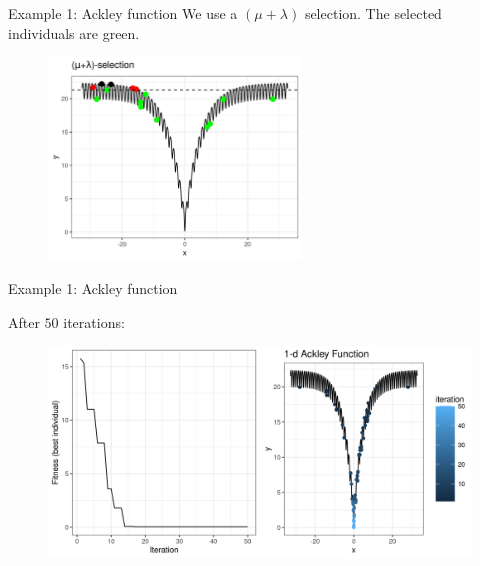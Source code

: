\documentclass[11pt,compress,t,notes=noshow, xcolor=table]{beamer}
\begin{document}
\begin{vbframe}{Example 1: Ackley function}
We use a $(\mu + \lambda)$ selection. The selected individuals are green.

\vspace{0.5cm}

\begin{center}
\begin{figure}
  \includegraphics[width=0.6\textwidth]{figure_man/1dim-ackley-func-selection.png}
\end{figure}
\end{center}


\end{vbframe}

\begin{vbframe}{Example 1: Ackley function}

After $50$ iterations: 

\vspace{0.5cm}

\begin{center}
\begin{figure}
  \includegraphics[width=1\textwidth]{figure_man/1dim-ackley-func-final.png}
\end{figure}
\end{center}


\end{vbframe}
\end{document}

